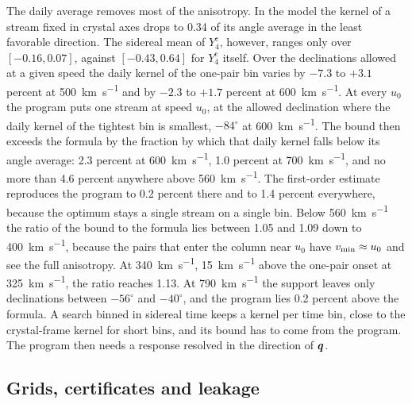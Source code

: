 The daily average removes most of the anisotropy. In the model the kernel of a stream fixed in crystal axes drops to 0.34 of its angle average in the least favorable direction. The sidereal mean of $Y^{\mathrm{c}}_4$, however, ranges only over $[-0.16, 0.07]$, against $[-0.43, 0.64]$ for $Y^{\mathrm{c}}_4$ itself. Over the declinations allowed at a given speed the daily kernel of the one-pair bin varies by $-7.3$ to $+3.1$ percent at \SI{500}{km.s^{-1}} and by $-2.3$ to $+1.7$ percent at \SI{600}{km.s^{-1}}. At every $u_0$ the program puts one stream at speed $u_0$, at the allowed declination where the daily kernel of the tightest bin is smallest, $-84^\circ$ at \SI{600}{km.s^{-1}}. The bound then exceeds the formula by the fraction by which that daily kernel falls below its angle average: 2.3 percent at \SI{600}{km.s^{-1}}, 1.0 percent at \SI{700}{km.s^{-1}}, and no more than 4.6 percent anywhere above \SI{560}{km.s^{-1}}. The first-order estimate reproduces the program to 0.2 percent there and to 1.4 percent everywhere, because the optimum stays a single stream on a single bin. Below \SI{560}{km.s^{-1}} the ratio of the bound to the formula lies between 1.05 and 1.09 down to \SI{400}{km.s^{-1}}, because the pairs that enter the column near $u_0$ have $v_{\mathrm{min}} \approx u_0$ and see the full anisotropy. At \SI{340}{km.s^{-1}}, \SI{15}{km.s^{-1}} above the one-pair onset at \SI{325}{km.s^{-1}}, the ratio reaches 1.13. At \SI{790}{km.s^{-1}} the support leaves only declinations between $-56^\circ$ and $-40^\circ$, and the program lies 0.2 percent above the formula. A search binned in sidereal time keeps a kernel per time bin, close to the crystal-frame kernel for short bins, and its bound has to come from the program. The program then needs a response resolved in the direction of $\bm{q}$.

\subsection{Grids, certificates and leakage}\label{sec:21.2-leak}

